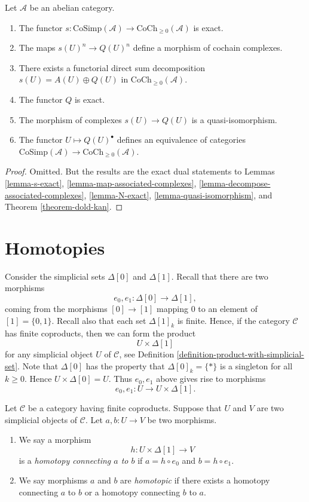 \begin{lemma}
\label{lemma-dual-dold-kan}
Let $\mathcal{A}$ be an abelian category.
\begin{enumerate}
\item The functor
$s : \text{CoSimp}(\mathcal{A}) \to \text{CoCh}_{\geq 0}(\mathcal{A})$
is exact.
\item The maps $s(U)^n \to Q(U)^n$ define a morphism
of cochain complexes.
\item There exists a functorial direct sum decomposition
$s(U) = A(U) \oplus Q(U)$ in $\text{CoCh}_{\geq 0}(\mathcal{A})$.
\item The functor $Q$ is exact.
\item The morphism of complexes $s(U) \to Q(U)$ is a quasi-isomorphism.
\item The functor $U \mapsto Q(U)^\bullet$ defines
an equivalence of categories
$\text{CoSimp}(\mathcal{A}) \to \text{CoCh}_{\geq 0}(\mathcal{A})$.
\end{enumerate}
\end{lemma}

\begin{proof}
Omitted. But the results are the exact dual statements to
Lemmas \ref{lemma-s-exact}, \ref{lemma-map-associated-complexes},
\ref{lemma-decompose-associated-complexes},
\ref{lemma-N-exact}, \ref{lemma-quasi-isomorphism}, and
Theorem \ref{theorem-dold-kan}.
\end{proof}

\section{Homotopies}
\label{section-homotopy}

\noindent
Consider the simplicial sets $\Delta[0]$ and $\Delta[1]$.
Recall that there are two morphisms
$$
e_0, e_1 : \Delta[0] \longrightarrow \Delta[1],
$$
coming from the morphisms $[0] \to [1]$ mapping
$0$ to an element of $[1] = \{0, 1\}$. Recall also that each
set $\Delta[1]_k$ is finite. Hence, if the category
$\mathcal{C}$ has finite coproducts, then we can
form the product
$$
U \times \Delta[1]
$$
for any simplicial object $U$ of $\mathcal{C}$, see
Definition \ref{definition-product-with-simplicial-set}.
Note that $\Delta[0]$ has the property that $\Delta[0]_k = \{*\}$
is a singleton for all $k \geq 0$. Hence $U \times \Delta[0]
= U$. Thus $e_0, e_1$ above gives rise to morphisms
$$
e_0, e_1 : U \to U \times \Delta[1].
$$

\begin{definition}
\label{definition-homotopy}
Let $\mathcal{C}$ be a category having finite coproducts.
Suppose that $U$ and $V$ are two simplicial objects of $\mathcal{C}$.
Let $a, b : U \to V$ be two morphisms.
\begin{enumerate}
\item We say a morphism
$$
h : U \times \Delta[1] \longrightarrow V
$$
is a {\it homotopy connecting $a$ to $b$} if $a = h \circ e_0$ and
$b = h \circ e_1$.
\item We say morphisms $a$ and $b$ are {\it homotopic}
if there exists a homotopy connecting $a$ to $b$ or a homotopy
connecting $b$ to $a$.
\end{enumerate}
\end{definition}

